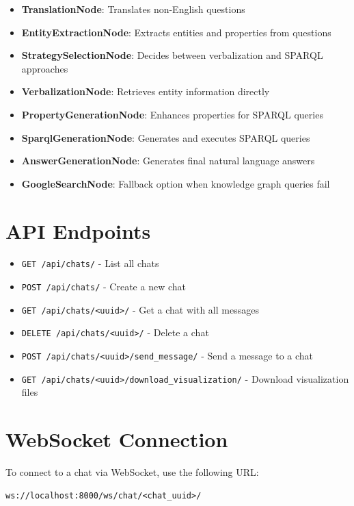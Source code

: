 \begin{itemize}
    \item \textbf{TranslationNode}: Translates non-English questions
    \item \textbf{EntityExtractionNode}: Extracts entities and properties from questions
    \item \textbf{StrategySelectionNode}: Decides between verbalization and SPARQL approaches
    \item \textbf{VerbalizationNode}: Retrieves entity information directly
    \item \textbf{PropertyGenerationNode}: Enhances properties for SPARQL queries
    \item \textbf{SparqlGenerationNode}: Generates and executes SPARQL queries
    \item \textbf{AnswerGenerationNode}: Generates final natural language answers
    \item \textbf{GoogleSearchNode}: Fallback option when knowledge graph queries fail
\end{itemize}

\section*{API Endpoints}

\begin{itemize}
    \item \texttt{GET /api/chats/} - List all chats
    \item \texttt{POST /api/chats/} - Create a new chat
    \item \texttt{GET /api/chats/<uuid>/} - Get a chat with all messages
    \item \texttt{DELETE /api/chats/<uuid>/} - Delete a chat
    \item \texttt{POST /api/chats/<uuid>/send\_message/} - Send a message to a chat
    \item \texttt{GET /api/chats/<uuid>/download\_visualization/} - Download visualization files
\end{itemize}

\section*{WebSocket Connection}

To connect to a chat via WebSocket, use the following URL:

\begin{lstlisting}
ws://localhost:8000/ws/chat/<chat_uuid>/
\end{lstlisting}

